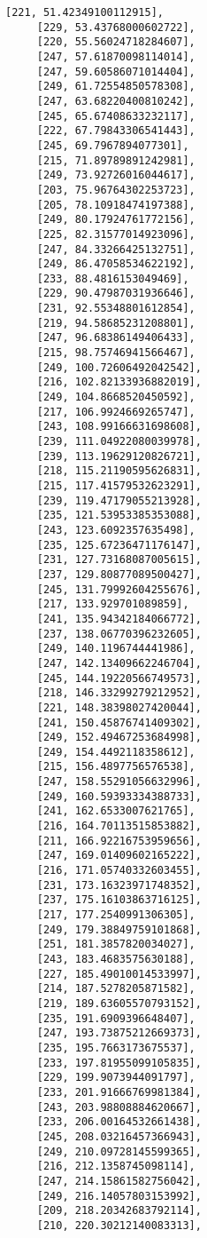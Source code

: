 \documentclass[11pt]{article}
\begin{document}
\begin{tcolorbox}[breakable, size=fbox, boxrule=.5pt, pad at break*=1mm, opacityfill=0]
\begin{Verbatim}[commandchars=\\\{\}]
     [221, 51.42349100112915],
     [229, 53.43768000602722],
     [220, 55.56024718284607],
     [247, 57.61870098114014],
     [247, 59.60586071014404],
     [249, 61.72554850578308],
     [247, 63.68220400810242],
     [245, 65.67408633232117],
     [222, 67.79843306541443],
     [245, 69.7967894077301],
     [215, 71.89789891242981],
     [249, 73.92726016044617],
     [203, 75.96764302253723],
     [205, 78.10918474197388],
     [249, 80.17924761772156],
     [225, 82.31577014923096],
     [247, 84.33266425132751],
     [249, 86.47058534622192],
     [233, 88.4816153049469],
     [229, 90.47987031936646],
     [231, 92.55348801612854],
     [219, 94.58685231208801],
     [247, 96.68386149406433],
     [215, 98.75746941566467],
     [249, 100.72606492042542],
     [216, 102.82133936882019],
     [249, 104.8668520450592],
     [217, 106.9924669265747],
     [243, 108.99166631698608],
     [239, 111.04922080039978],
     [239, 113.19629120826721],
     [218, 115.21190595626831],
     [215, 117.41579532623291],
     [239, 119.47179055213928],
     [235, 121.53953385353088],
     [243, 123.6092357635498],
     [235, 125.67236471176147],
     [231, 127.73168087005615],
     [237, 129.80877089500427],
     [245, 131.79992604255676],
     [217, 133.929701089859],
     [241, 135.94342184066772],
     [237, 138.06770396232605],
     [249, 140.1196744441986],
     [247, 142.13409662246704],
     [245, 144.19220566749573],
     [218, 146.33299279212952],
     [221, 148.38398027420044],
     [241, 150.45876741409302],
     [249, 152.49467253684998],
     [249, 154.4492118358612],
     [215, 156.4897756576538],
     [247, 158.55291056632996],
     [249, 160.59393334388733],
     [241, 162.6533007621765],
     [216, 164.70113515853882],
     [211, 166.92216753959656],
     [247, 169.01409602165222],
     [216, 171.05740332603455],
     [231, 173.16323971748352],
     [237, 175.16103863716125],
     [217, 177.2540991306305],
     [249, 179.38849759101868],
     [251, 181.3857820034027],
     [243, 183.4683575630188],
     [227, 185.49010014533997],
     [214, 187.5278205871582],
     [219, 189.63605570793152],
     [235, 191.6909396648407],
     [247, 193.73875212669373],
     [235, 195.7663173675537],
     [233, 197.81955099105835],
     [229, 199.9073944091797],
     [233, 201.91666769981384],
     [243, 203.98808884620667],
     [233, 206.00164532661438],
     [245, 208.03216457366943],
     [249, 210.09728145599365],
     [216, 212.1358745098114],
     [247, 214.15861582756042],
     [249, 216.14057803153992],
     [209, 218.20342683792114],
     [210, 220.30212140083313],

\end{Verbatim}
\end{tcolorbox}
\end{document}
